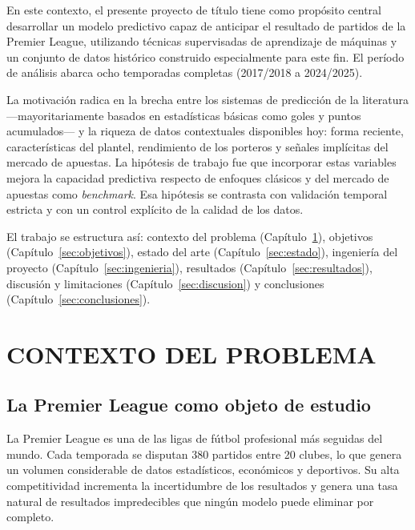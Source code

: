 \documentclass[12pt,letterpaper,oneside]{report}
\begin{document}
En este contexto, el presente proyecto de título tiene como propósito central desarrollar un modelo predictivo capaz de anticipar el resultado de partidos de la Premier League, utilizando técnicas supervisadas de aprendizaje de máquinas y un conjunto de datos histórico construido especialmente para este fin. El período de análisis abarca ocho temporadas completas (2017/2018 a 2024/2025).

La motivación radica en la brecha entre los sistemas de predicción de la literatura ---mayoritariamente basados en estadísticas básicas como goles y puntos acumulados--- y la riqueza de datos contextuales disponibles hoy: forma reciente, características del plantel, rendimiento de los porteros y señales implícitas del mercado de apuestas. La hipótesis de trabajo fue que incorporar estas variables mejora la capacidad predictiva respecto de enfoques clásicos y del mercado de apuestas como \textit{benchmark}. Esa hipótesis se contrasta con validación temporal estricta y con un control explícito de la calidad de los datos.

El trabajo se estructura así: contexto del problema (Capítulo~\ref{sec:contexto}), objetivos (Capítulo~\ref{sec:objetivos}), estado del arte (Capítulo~\ref{sec:estado}), ingeniería del proyecto (Capítulo~\ref{sec:ingenieria}), resultados (Capítulo~\ref{sec:resultados}), discusión y limitaciones (Capítulo~\ref{sec:discusion}) y conclusiones (Capítulo~\ref{sec:conclusiones}).

\chapter{CONTEXTO DEL PROBLEMA}
\label{sec:contexto}

\section{La Premier League como objeto de estudio}
La Premier League es una de las ligas de fútbol profesional más seguidas del mundo. Cada temporada se disputan 380 partidos entre 20 clubes, lo que genera un volumen considerable de datos estadísticos, económicos y deportivos. Su alta competitividad incrementa la incertidumbre de los resultados y genera una tasa natural de resultados impredecibles que ningún modelo puede eliminar por completo.
\end{document}
